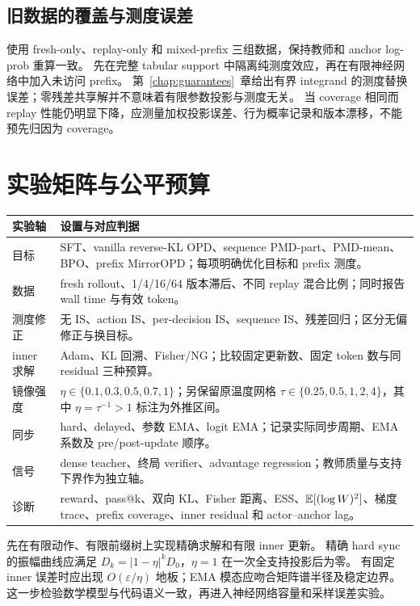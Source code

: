 \subsection{旧数据的覆盖与测度误差}
使用 fresh-only、replay-only 和 mixed-prefix 三组数据，保持教师和 anchor log-prob 重算一致。
先在完整 tabular support 中隔离纯测度效应，再在有限神经网络中加入未访问 prefix。
第~\ref{chap:guarantees}~章给出有界 integrand 的测度替换误差；零残差共享解并不意味着有限参数投影与测度无关。
当 coverage 相同而 replay 性能仍明显下降，应测量加权投影误差、行为概率记录和版本漂移，不能预先归因为 coverage。

\section{实验矩阵与公平预算}
\begin{table}[htbp]
\centering
\begin{tabular}{p{}p{}}
\toprule
实验轴 & 设置与对应判据\\\midrule
目标 & SFT、vanilla reverse-KL OPD、sequence PMD-part、PMD-mean、BPO、prefix MirrorOPD；每项明确优化目标和 prefix 测度。\\
数据 & fresh rollout、1/4/16/64 版本滞后、不同 replay 混合比例；同时报告 wall time 与有效 token。\\
测度修正 & 无 IS、action IS、per-decision IS、sequence IS、残差回归；区分无偏修正与换目标。\\
inner 求解 & Adam、KL 回溯、Fisher/NG；比较固定更新数、固定 token 数与同 residual 三种预算。\\
镜像强度 & $\eta\in\{0.1,0.3,0.5,0.7,1\}$；另保留原温度网格 $\tau\in\{0.25,0.5,1,2,4\}$，其中 $\eta=\tau^{-1}>1$ 标注为外推区间。\\
同步 & hard、delayed、参数 EMA、logit EMA；记录实际同步周期、EMA 系数及 pre/post-update 顺序。\\
信号 & dense teacher、终局 verifier、advantage regression；教师质量与支持下界作为独立轴。\\
诊断 & reward、pass@k、双向 KL、Fisher 距离、ESS、$\mathbb{E}[(\log W)^2]$、梯度 trace、prefix coverage、inner residual 和 actor--anchor lag。\\
\bottomrule
\end{tabular}
\end{table}

先在有限动作、有限前缀树上实现精确求解和有限 inner 更新。
精确 hard sync 的振幅曲线应满足 $D_k=|1-\eta|^kD_0$，$\eta=1$ 在一次全支持投影后为零。
有固定 inner 误差时应出现 $O(\varepsilon/\eta)$ 地板；EMA 模态应吻合矩阵谱半径及稳定边界。
这一步检验数学模型与代码语义一致，再进入神经网络容量和采样误差实验。

